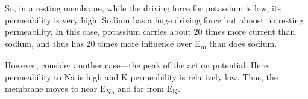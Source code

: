 So, in a resting membrane, while the driving force for potassium is low, its permeability is very high. Sodium has a huge driving force but almost no resting permeability. In this case, potassium carries about 20 times more current than sodium, and thus has 20 times more influence over E\textsubscript{m} than does sodium.

However, consider another case---the peak of the action potential. Here, permeability to Na is high and K permeability is relatively low. Thus, the membrane moves to near E\textsubscript{Na} and far from E\textsubscript{K}.


